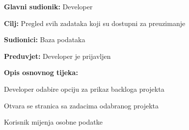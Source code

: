                         	\noindent {}
                        	\begin{packed_item}
                        		
                        		\item \textbf{Glavni sudionik: }Developer
                        		\item  \textbf{Cilj:} Pregled svih zadataka koji su dostupni za preuzimanje
                        		\item  \textbf{Sudionici:} Baza podataka
                        		\item  \textbf{Preduvjet:} Developer je prijavljen
                        		\item  \textbf{Opis osnovnog tijeka:}
                        		
                        		\item[] \begin{packed_enum}
                        			
                        			\item Developer odabire opciju za prikaz backloga projekta
                        			\item Otvara se stranica sa zadacima odabranog projekta
                        			\item Korisnik mijenja osobne podatke
                        			
                        		\end{packed_enum}
                        		
                        		
                        	\end{packed_item}
                        	\noindent {}
